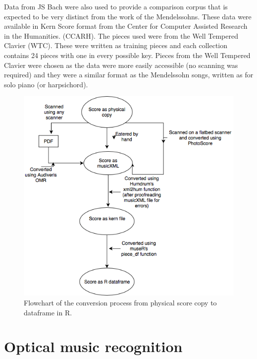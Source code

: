 \documentclass[12pt,twoside]{reedthesis}
\theoremstyle{definition}
\theoremstyle{definition}
\theoremstyle{definition}
\theoremstyle{remark}
\begin{document}
Data from JS Bach were also used to provide a comparison corpus that is
expected to be very distinct from the work of the Mendelssohns. These
data were available in Kern Score format from the Center for Computer
Assisted Research in the Humanities. (CCARH). The pieces used were from
the Well Tempered Clavier (WTC). These were written as training pieces
and each collection contains 24 pieces with one in every possible key.
Pieces from the Well Tempered Clavier were chosen as the data were more
easily accessible (no scanning was required) and they were a similar
format as the Mendelssohn songs, written as for solo piano (or
harpsichord).
\begin{figure}[h]
\centering
\includegraphics[scale = .5]{images/test.png}
\caption{Flowchart of the conversion process from physical score copy to dataframe in R.}
\label{subd}
\end{figure}
\section{Optical music recognition}\label{optical-music-recognition}
\end{document}

